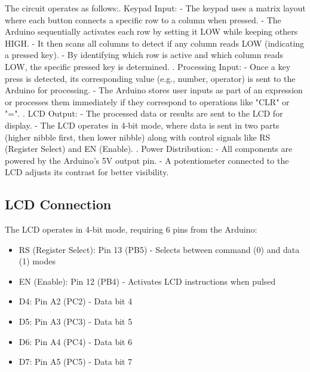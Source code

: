 \documentclass[12pt]{article}
\begin{document}
The circuit operates as follows:. Keypad Input:\newline
   - The keypad uses a matrix layout where each button connects a specific row to a column when pressed.\newline
   - The Arduino sequentially activates each row by setting it LOW while keeping others HIGH.\newline
   - It then scans all columns to detect if any column reads LOW (indicating a pressed key).\newline
   - By identifying which row is active and which column reads LOW, the specific pressed key is determined.
   . Processing Input:\newline
   - Once a key press is detected, its corresponding value (e.g., number, operator) is sent to the Arduino for processing.\newline
   - The Arduino stores user inputs as part of an expression or processes them immediately if they correspond to operations like "CLR" or "=".
   . LCD Output:\newline
   - The processed data or results are sent to the LCD for display.\newline
   - The LCD operates in 4-bit mode, where data is sent in two parts (higher nibble first, then lower nibble) along with control signals like RS (Register Select) and EN (Enable).
   . Power Distribution:\newline
   - All components are powered by the Arduino's 5V output pin.\newline
   - A potentiometer connected to the LCD adjusts its contrast for better visibility.
   \newline
\subsection*{LCD Connection}
The LCD operates in 4-bit mode, requiring 6 pins from the Arduino:
\begin{itemize}
\item RS (Register Select): Pin 13 (PB5) - Selects between command (0) and data (1) modes
\item EN (Enable): Pin 12 (PB4) - Activates LCD instructions when pulsed
\item D4: Pin A2 (PC2) - Data bit 4
\item D5: Pin A3 (PC3) - Data bit 5
\item D6: Pin A4 (PC4) - Data bit 6
\item D7: Pin A5 (PC5) - Data bit 7
\end{itemize}
\end{document}
